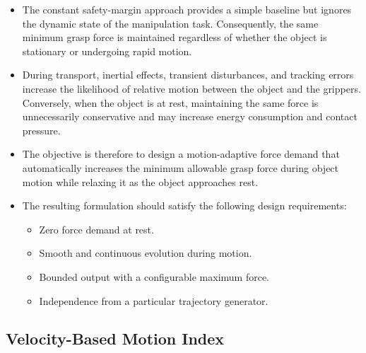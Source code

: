 \documentclass[conference]{IEEEtran}
\begin{document}
\begin{itemize}
    \item The constant safety-margin approach provides a simple baseline but ignores the dynamic state of the manipulation task. Consequently, the same minimum grasp force is maintained regardless of whether the object is stationary or undergoing rapid motion.

    \item During transport, inertial effects, transient disturbances, and tracking errors increase the likelihood of relative motion between the object and the grippers. Conversely, when the object is at rest, maintaining the same force is unnecessarily conservative and may increase energy consumption and contact pressure.

    \item The objective is therefore to design a motion-adaptive force demand that automatically increases the minimum allowable grasp force during object motion while relaxing it as the object approaches rest.

    \item The resulting formulation should satisfy the following design requirements:
    \begin{itemize}
        \item Zero force demand at rest.
        \item Smooth and continuous evolution during motion.
        \item Bounded output with a configurable maximum force.
        \item Independence from a particular trajectory generator.
    \end{itemize}
\end{itemize}


\subsection{Velocity-Based Motion Index}
\end{document}
